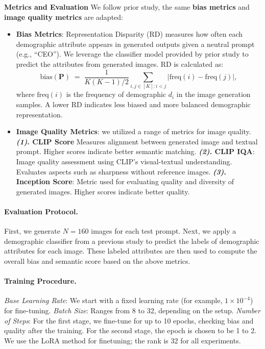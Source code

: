 \textbf{Metrics and Evaluation} We follow prior study\cite{shen2024finetuningtexttoimagediffusionmodels}, the same \textbf{bias metrics} and \textbf{image quality metrics} are adapted:
\begin{itemize}[leftmargin=*]
    \vspace{-1em}
    \item \textbf{Bias Metrics}: Representation Disparity (RD) 
    measures how often each demographic attribute appears in generated outputs given a neutral prompt (e.g., ``CEO''). We leverage the classifier model provided by prior study to predict the attributes from generated images. RD is calculated as:
    \[
            \mathrm{bias}(\mathbf{P}) 
            \;=\; 
            \frac{1}{K(K-1)/2} \sum_{i,j \in [K] : i < j} \bigl|\mathrm{freq}(i) - \mathrm{freq}(j)\bigr|,
    \]
    where $\mathrm{freq}(i)$ is the frequency of demographic $d_i$ in the image generation samples. A lower RD indicates less biased and more balanced demographic representation.
    \vspace{-1em}
    \item \textbf{Image Quality Metrics}: we utilized a range of metrics for image quality.  \textbf{\emph{(1)}. CLIP Score}
    Measures alignment between generated image and textual prompt. Higher scores indicate better semantic matching.
\textbf{\emph{(2)}. CLIP IQA}:
    Image quality assessment using CLIP's visual-textual understanding. Evaluates aspects such as sharpness without reference images.
 \textbf{\emph{(3)}. Inception Score}:
    Metric used for evaluating quality and diversity of generated images. Higher scores indicate better quality.
\end{itemize}
\vspace{-1em}
\paragraph{Evaluation Protocol.}
First, we generate $N = 160$ images for each test prompt. Next, we apply a demographic classifier from a previous study \cite{shen2024finetuningtexttoimagediffusionmodels} to predict the labels of demographic attributes for each image. These labeled attributes are then used to compute the overall bias and semantic score based on the above metrics. 
\vspace{-1em}
\paragraph{Training Procedure.} \emph{Base Learning Rate}: We start with a fixed learning rate (for example, $1\times10^{-4}$) for fine-tuning. \emph{Batch Size}: Ranges from 8 to 32, depending on the setup. \emph{Number of Steps}: For the first stage, we fine-tune for up to 10 epochs,  checking bias and quality after the training.  For the second stage, the epoch is chosen to be 1 to 2. We use the LoRA\cite{hu2021loralowrankadaptationlarge} method for finetuning; the rank is 32 for all experiments. 

